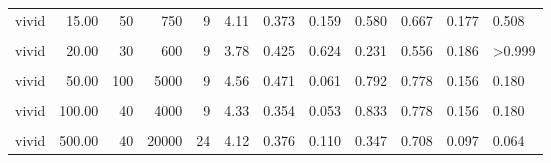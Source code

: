 \documentclass[
]{article}
\begin{document}
\begin{longtable}[t]{lrrrrrrlrrrl}
\hspace{1em}vivid & 15.00 & 50 & 750 & 9 & 4.11 & 0.373 & 0.159 & 0.580 & 0.667 & 0.177 & 0.508\\
\hspace{1em}\cellcolor{gray!10}{vivid} & \cellcolor{gray!10}{20.00} & \cellcolor{gray!10}{10} & \cellcolor{gray!10}{200} & \cellcolor{gray!10}{24} & \cellcolor{gray!10}{3.38} & \cellcolor{gray!10}{0.267} & \cellcolor{gray!10}{0.714} & \cellcolor{gray!10}{-0.098} & \cellcolor{gray!10}{0.500} & \cellcolor{gray!10}{0.106} & \cellcolor{gray!10}{>0.999}\\
\hspace{1em}vivid & 20.00 & 30 & 600 & 9 & 3.78 & 0.425 & 0.624 & 0.231 & 0.556 & 0.186 & >0.999\\
\hspace{1em}\cellcolor{gray!10}{vivid} & \cellcolor{gray!10}{50.00} & \cellcolor{gray!10}{10} & \cellcolor{gray!10}{500} & \cellcolor{gray!10}{24} & \cellcolor{gray!10}{3.88} & \cellcolor{gray!10}{0.350} & \cellcolor{gray!10}{0.284} & \cellcolor{gray!10}{0.224} & \cellcolor{gray!10}{0.625} & \cellcolor{gray!10}{0.103} & \cellcolor{gray!10}{0.307}\\
\hspace{1em}vivid & 50.00 & 100 & 5000 & 9 & 4.56 & 0.471 & 0.061 & 0.792 & 0.778 & 0.156 & 0.180\\
\hspace{1em}\cellcolor{gray!10}{vivid} & \cellcolor{gray!10}{100.00} & \cellcolor{gray!10}{30} & \cellcolor{gray!10}{3000} & \cellcolor{gray!10}{24} & \cellcolor{gray!10}{3.75} & \cellcolor{gray!10}{0.315} & \cellcolor{gray!10}{0.494} & \cellcolor{gray!10}{0.165} & \cellcolor{gray!10}{0.500} & \cellcolor{gray!10}{0.106} & \cellcolor{gray!10}{>0.999}\\
\hspace{1em}vivid & 100.00 & 40 & 4000 & 9 & 4.33 & 0.354 & 0.053 & 0.833 & 0.778 & 0.156 & 0.180\\
\hspace{1em}\cellcolor{gray!10}{vivid} & \cellcolor{gray!10}{500.00} & \cellcolor{gray!10}{10} & \cellcolor{gray!10}{5000} & \cellcolor{gray!10}{9} & \cellcolor{gray!10}{4.67} & \cellcolor{gray!10}{0.395} & \cellcolor{gray!10}{0.031} & \cellcolor{gray!10}{1.043} & \cellcolor{gray!10}{0.778} & \cellcolor{gray!10}{0.156} & \cellcolor{gray!10}{0.180}\\
\hspace{1em}vivid & 500.00 & 40 & 20000 & 24 & 4.12 & 0.376 & 0.110 & 0.347 & 0.708 & 0.097 & 0.064\\

\end{longtable}
\end{document}
